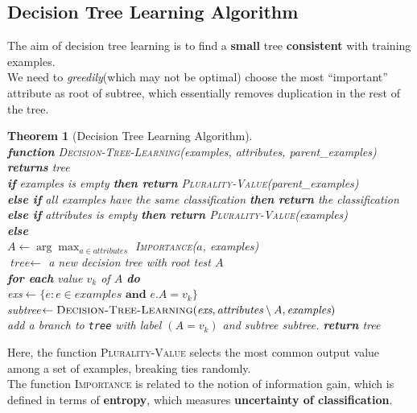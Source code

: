 \documentclass[12pt]{article}
\newcommand{\ind}{\hspace*{15pt}}
\newtheorem{theorem}{Theorem}[section]
\theoremstyle{definition}
\begin{document}
\subsection{Decision Tree Learning Algorithm}
The aim of decision tree learning is to find a \textbf{small} tree \textbf{consistent} with training examples.\\
We need to \textit{greedily}(which may not be optimal) choose the most ``important'' attribute as root of subtree, which essentially removes duplication in the rest of the tree.\\
\begin{theorem}[Decision Tree Learning Algorithm]
\hfill\\\normalfont
\textbf{function} \textsc{Decision-Tree-Learning}(\textit{examples, attributes, parent\_examples}) \textbf{returns} tree\\
\ind \textbf{if} \textit{examples} is empty \textbf{then return} \textsc{Plurality-Value}(\textit{parent\_examples})\\
\ind \textbf{else if} all \textit{examples} have the same classification \textbf{then return} the classification\\
\ind \textbf{else if} \textit{attributes} is empty \textbf{then return} \textsc{Plurality-Value}(\textit{examples})\\
\ind \textbf{else}\\
\ind\ind $A\leftarrow \arg\max_{a\in \textit{attributes}}$ \textsc{Importance}($a$, \textit{examples})\\
\ind\ind $\textit{tree}\leftarrow$ a new decision tree with root test $A$\\
\ind\ind \textbf{for each} value $v_k$ of $A$ \textbf{do}\\
\ind\ind\ind \textit{exs}$\leftarrow\{e: e\in \textit{examples} \textbf{ and }e.A=v_k \}$\\
\ind\ind\ind \textit{subtree}$\leftarrow\textsc{Decision-Tree-Learning}(\textit{exs}, \textit{attributes}\setminus A, \textit{examples})$\\
\ind\ind\ind add a branch to \texttt{tree} with label $(A=v_k)$ and subtree \textit{subtree}.
\ind\ind \textbf{return} \textit{tree}\\
\end{theorem}
Here, the function \textsc{Plurality-Value} selects the most common output value among a set of examples, breaking ties randomly.\\
The function \textsc{Importance} is related to the notion of information gain, which is defined in terms of \textbf{entropy}, which measures \textbf{uncertainty of classification}.
\end{document}
